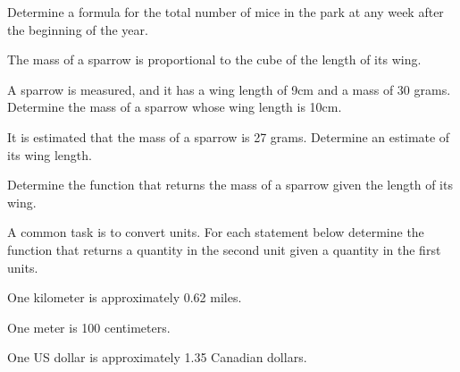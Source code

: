 \begin{problem}
\begin{subproblem}
  \item Determine a formula for the total number of mice in the park
    at any week after the beginning of the year.
    \vfill
  \end{subproblem}

\clearpage

\item The mass of a sparrow is proportional to the cube of the length of its wing.
  \begin{subproblem}
  \item \label{sparrowWingArea} A sparrow is measured, and it has a
    wing length of 9cm and a mass of 30 grams.  Determine the mass of
    a sparrow whose wing length is 10cm.  

    \vfill

  \item \label{sparrowMass} It is estimated that the mass of a sparrow
    is 27 grams. Determine an estimate of its wing length.  

    \vfill

  \item Determine the function that returns the mass of a sparrow
    given the length of its wing.

    \vfill
  \end{subproblem}

\clearpage

\item A common task is to convert units. For each statement below
  determine the function that returns a quantity in the second unit
  given a quantity in the first units.  
  \begin{subproblem}
    \item One kilometer is approximately 0.62 miles.
      \vfill
    \item One meter is 100 centimeters.
      \vfill
    \item One US dollar is approximately 1.35 Canadian dollars.
      \vfill
  \end{subproblem}


\end{problem}

\postClass

